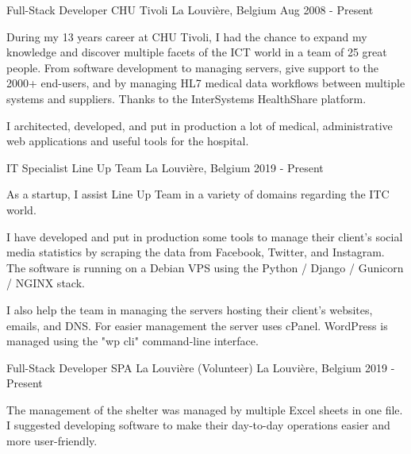 

\begin{cventries}

  \cventry
    {Full-Stack Developer} %
    {CHU Tivoli} %
    {La Louvière, Belgium} %
    {Aug 2008 - Present} %
    {
During my 13 years career at CHU Tivoli, I had the chance to expand my knowledge and discover multiple facets of the ICT world in a team of 25  great people. From software development to managing servers, give support to the 2000+ end-users, and by managing HL7 medical data workflows between multiple systems and suppliers. Thanks to the InterSystems HealthShare platform.
    
I architected, developed, and put in production a lot of medical, administrative web applications and useful tools for the hospital.

    }

  \cventry
    {IT Specialist} %
    {Line Up Team} %
    {La Louvière, Belgium} %
    {2019 - Present} %
    {
As a startup, I assist Line Up Team in a variety of domains regarding the ITC world.

I have developed and put in production some tools to manage their client's social media statistics by scraping the data from Facebook, Twitter, and Instagram. The software is running on a Debian VPS using the Python / Django / Gunicorn / NGINX stack.

I also help the team in managing the servers hosting their client's websites, emails, and DNS. For easier management the server uses cPanel. WordPress is managed using the "wp cli" command-line interface.

    }
    
    
  \cventry
    {Full-Stack Developer} %
    {SPA La Louvière (Volunteer)} %
    {La Louvière, Belgium} %
    {2019 - Present} %
    {
The management of the shelter was managed by multiple Excel sheets in one file.
I suggested developing software to make their day-to-day operations easier and more user-friendly.

}
\end{cventries}
